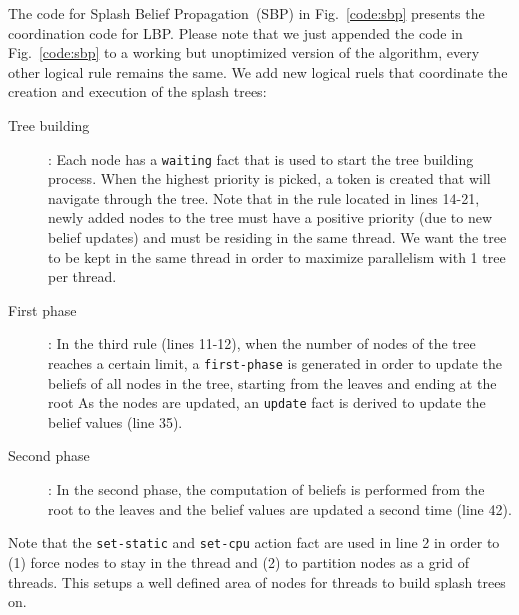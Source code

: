 The code for Splash Belief Propagation~(SBP) in Fig.~\ref{code:sbp} presents the
coordination code for LBP.  Please note that we just appended the code in
Fig.~\ref{code:sbp} to a working but unoptimized version of the algorithm, every
other logical rule remains the same. We add new logical ruels that coordinate
the creation and execution of the splash trees:

\begin{description}
   \item[Tree building]: Each node has a \texttt{waiting} fact that is used to
   start the tree building process. When the highest priority is picked, a token
   is created that will navigate through the tree. Note that in the rule located
   in lines 14-21, newly added nodes to the tree must have a positive priority
   (due to new belief updates) and must be residing in the same thread.
   We want the tree to be kept in the same thread in order to maximize
   parallelism with 1 tree per thread.
   \item[First phase]: In the third rule (lines 11-12), when the number of nodes
   of the tree reaches a certain limit, a 
   \texttt{first-phase} is generated in order to update the beliefs of all nodes
   in the tree, starting from the leaves and ending at the root
   As the nodes are updated, an \texttt{update} fact is derived to update
   the belief values (line 35).
   \item[Second phase]: In the second phase, the computation of beliefs is
   performed from the root to the leaves and the belief values are updated a
   second time (line 42).
\end{description}

Note that the \texttt{set-static} and \texttt{set-cpu} action fact are used in
line 2 in order to (1) force nodes to stay in the thread and (2) to partition
nodes as a grid of threads. This setups a well defined area of nodes
for threads to build splash trees on.

